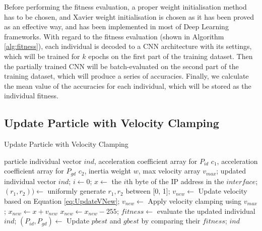 \documentclass[conference]{IEEEtran}
\begin{document}
Before performing the fitness evaluation, a proper weight initialisation method has to be chosen, and Xavier weight initialisation \cite{WeightIniti:Glorot} is chosen as it has been proved as an effective way, and has been implemented in most of Deep Learning frameworks. With regard to the fitness evaluation (shown in Algorithm \ref{alg:fitness}), each individual is decoded to a CNN architecture with its settings, which will be trained for $k$ epochs on the first part of the training dataset. Then the partially trained CNN will be batch-evaluated on the second part of the training dataset, which will produce a series of accuracies. Finally, we calculate the mean value of the accuracies for each individual, which will be stored as the individual fitness.


\subsection{Update Particle with Velocity Clamping}
\begin{algorithm}
	\caption{Update Particle with Velocity Clamping}
	\label{alg:update}
	\begin{algorithmic}
		\renewcommand{\algorithmicrequire}{\textbf{Input:}}
		\renewcommand{\algorithmicensure}{\textbf{Output:}}
		\REQUIRE particle individual vector $ind$, acceleration coefficient array for $P_{id}$ $c_{1}$, acceleration coefficient array for $P_{gd}$ $c_{2}$, inertia weight $w$, max velocity array $v_{max}$;
		\ENSURE updated individual vector $ind$;
			\STATE $i \leftarrow 0$;
				\STATE $x \leftarrow$ the $i$th byte of the IP address in the $interface$;
				\STATE $(r_{1}, r_{2})) \leftarrow$ uniformly generate $r_{1}, r_{2}$ between [0, 1];
				\STATE $v_{new} \leftarrow$ Update velocity based on Equation \ref{eq:UpdateVNew};
				\STATE $v_{new} \leftarrow$ Apply velocity clamping using $v_{max}$;
				\STATE $x_{new} \leftarrow x + v_{new}$
					\STATE $x_{new} \leftarrow x_{new}-255$;
				\ENDIF
			\ENDFOR
		\ENDFOR
		\STATE $fitness \leftarrow$ evaluate the updated individual $ind$;
		\STATE $(P_{id}, P_{gd}) \leftarrow$ Update $pbest$ and $gbest$ by comparing their $fitness$;
		\RETURN $ind$
	\end{algorithmic}
\end{algorithm}
\end{document}
